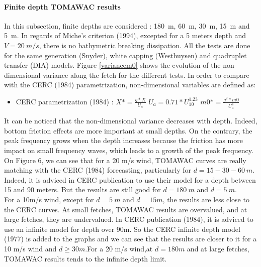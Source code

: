 \paragraph{Finite depth TOMAWAC results}
In this subsection, finite depths are considered : 180~m, 60~m, 30~m, 15~m and 5~m. In regards of Miche's criterion (1994), excepted for a 5 meters depth and $V = 20~m/s$, there is no bathymetric breaking dissipation. All the tests are done for the same generation (Snyder), white capping (Westhuysen) and quadruplet transfer (DIA) models. Figure \ref{variancem0} shows the evolution of the non-dimensional variance along the fetch for the different tests. In order to compare with the CERC (1984) parametrization, non-dimensional variables are defined as:\\
\begin{itemize}
\item CERC parametrization (1984) :
\subitem $X* = \frac{g*X}{U_a}$
\subitem $U_a = 0.71*U_{10}^{1.23}$
\subitem $m0* = \frac{g^2*m0}{U_a^4}$
\end{itemize}
It can be noticed that the non-dimensional variance decreases with depth. Indeed, bottom friction effects are more important at small depths. On the contrary, the peak frequency grows when the depth increases because the friction has more impact on small frequency waves, which leads to a growth of the peak frequency.\\
On Figure 6, we can see that for a 20 m/s wind, TOMAWAC curves are really matching with the CERC (1984) forecasting, particularly for $d = 15 - 30 - 60~m$. Indeed, it is adviced in CERC publication to use their model for a depth between 15 and 90 meters. But the results are still good for $d = 180~m$ and $d = 5~m$.\\
For a 10m/s wind, except for $d = 5~m $ and $d = 15 m$, the results are less close to the CERC curves. At small fetches, TOMAWAC results are overvalued, and at large fetches, they are undervalued. In CERC publication (1984), it is adviced to use an infinite model for depth over 90m. So the CERC infinite depth model (1977) is added to the graphs and we can see that the results are closer to it for a 10 m/s wind and $d \geq 30m$.For a 20 m/s wind,at $d = 180m$ and at large fetches, TOMAWAC results tends to the infinite depth limit.
